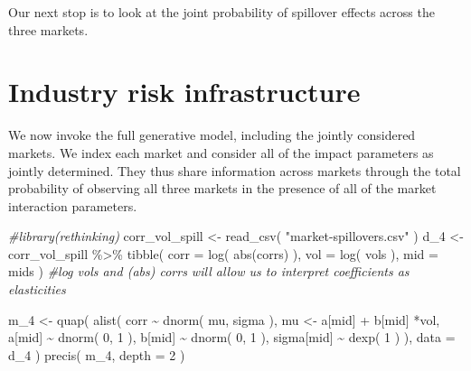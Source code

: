\documentclass{article}
\newenvironment{Shaded}{\begin{snugshade}}{\end{snugshade}}
\newcommand{\AttributeTok}[1]{\textcolor[rgb]{0.77,0.63,0.00}{#1}}
\newcommand{\CommentTok}[1]{\textcolor[rgb]{0.56,0.35,0.01}{\textit{#1}}}
\newcommand{\DecValTok}[1]{\textcolor[rgb]{0.00,0.00,0.81}{#1}}
\newcommand{\FunctionTok}[1]{\textcolor[rgb]{0.00,0.00,0.00}{#1}}
\newcommand{\NormalTok}[1]{#1}
\newcommand{\OtherTok}[1]{\textcolor[rgb]{0.56,0.35,0.01}{#1}}
\newcommand{\SpecialCharTok}[1]{\textcolor[rgb]{0.00,0.00,0.00}{#1}}
\newcommand{\StringTok}[1]{\textcolor[rgb]{0.31,0.60,0.02}{#1}}
\begin{document}
Our next stop is to look at the joint probability of spillover effects
across the three markets.

\hypertarget{industry-risk-infrastructure}{%
\section{Industry risk
infrastructure}\label{industry-risk-infrastructure}}

We now invoke the full generative model, including the jointly
considered markets. We index each market and consider all of the impact
parameters as jointly determined. They thus share information across
markets through the total probability of observing all three markets in
the presence of all of the market interaction parameters.

\begin{Shaded}
\begin{Highlighting}[]
\CommentTok{\#library(rethinking)}
\NormalTok{corr\_vol\_spill }\OtherTok{\textless{}{-}} \FunctionTok{read\_csv}\NormalTok{( }\StringTok{"market{-}spillovers.csv"}\NormalTok{ )}
\NormalTok{d\_4 }\OtherTok{\textless{}{-}}\NormalTok{ corr\_vol\_spill }\SpecialCharTok{\%\textgreater{}\%} 
  \FunctionTok{tibble}\NormalTok{(}
    \AttributeTok{corr =} \FunctionTok{log}\NormalTok{( }\FunctionTok{abs}\NormalTok{(corrs) ),}
    \AttributeTok{vol =} \FunctionTok{log}\NormalTok{( vols ),}
    \AttributeTok{mid =}\NormalTok{ mids}
\NormalTok{)}
\CommentTok{\#log vols and (abs) corrs will allow us to interpret coefficients as elasticities}
\end{Highlighting}
\end{Shaded}

\begin{Shaded}
\begin{Highlighting}[]
\NormalTok{m\_4 }\OtherTok{\textless{}{-}} \FunctionTok{quap}\NormalTok{(}
  \FunctionTok{alist}\NormalTok{(}
\NormalTok{    corr }\SpecialCharTok{\textasciitilde{}} \FunctionTok{dnorm}\NormalTok{( mu, sigma ),}
\NormalTok{    mu }\OtherTok{\textless{}{-}}\NormalTok{ a[mid] }\SpecialCharTok{+}\NormalTok{ b[mid] }\SpecialCharTok{*}\NormalTok{vol,}
\NormalTok{    a[mid] }\SpecialCharTok{\textasciitilde{}} \FunctionTok{dnorm}\NormalTok{( }\DecValTok{0}\NormalTok{, }\DecValTok{1}\NormalTok{ ),}
\NormalTok{    b[mid] }\SpecialCharTok{\textasciitilde{}} \FunctionTok{dnorm}\NormalTok{( }\DecValTok{0}\NormalTok{, }\DecValTok{1}\NormalTok{ ),}
\NormalTok{    sigma[mid] }\SpecialCharTok{\textasciitilde{}} \FunctionTok{dexp}\NormalTok{( }\DecValTok{1}\NormalTok{ )}
\NormalTok{  ),}
  \AttributeTok{data =}\NormalTok{ d\_4}
\NormalTok{)}
\FunctionTok{precis}\NormalTok{( m\_4, }\AttributeTok{depth =} \DecValTok{2}\NormalTok{ )}
\end{Highlighting}
\end{Shaded}
\end{document}
